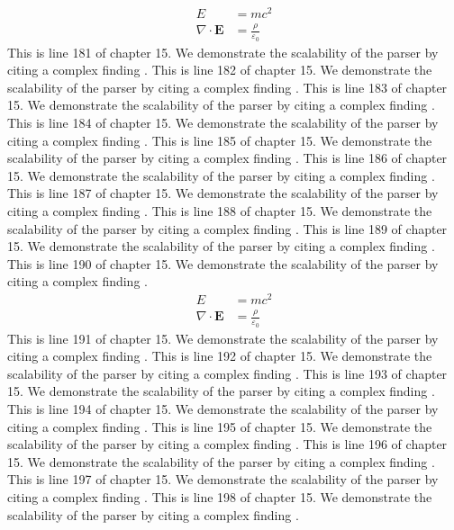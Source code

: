 \begin{align*}
  E &= mc^2 \\
  \nabla \cdot \mathbf{E} &= \frac{\rho}{\varepsilon_0}
\end{align*}
This is line 181 of chapter 15. We demonstrate the scalability of the parser by citing a complex finding \cite{ref15_181}.
This is line 182 of chapter 15. We demonstrate the scalability of the parser by citing a complex finding \cite{ref15_182}.
This is line 183 of chapter 15. We demonstrate the scalability of the parser by citing a complex finding \cite{ref15_183}.
This is line 184 of chapter 15. We demonstrate the scalability of the parser by citing a complex finding \cite{ref15_184}.
This is line 185 of chapter 15. We demonstrate the scalability of the parser by citing a complex finding \cite{ref15_185}.
This is line 186 of chapter 15. We demonstrate the scalability of the parser by citing a complex finding \cite{ref15_186}.
This is line 187 of chapter 15. We demonstrate the scalability of the parser by citing a complex finding \cite{ref15_187}.
This is line 188 of chapter 15. We demonstrate the scalability of the parser by citing a complex finding \cite{ref15_188}.
This is line 189 of chapter 15. We demonstrate the scalability of the parser by citing a complex finding \cite{ref15_189}.
This is line 190 of chapter 15. We demonstrate the scalability of the parser by citing a complex finding \cite{ref15_190}.
\begin{align*}
  E &= mc^2 \\
  \nabla \cdot \mathbf{E} &= \frac{\rho}{\varepsilon_0}
\end{align*}
This is line 191 of chapter 15. We demonstrate the scalability of the parser by citing a complex finding \cite{ref15_191}.
This is line 192 of chapter 15. We demonstrate the scalability of the parser by citing a complex finding \cite{ref15_192}.
This is line 193 of chapter 15. We demonstrate the scalability of the parser by citing a complex finding \cite{ref15_193}.
This is line 194 of chapter 15. We demonstrate the scalability of the parser by citing a complex finding \cite{ref15_194}.
This is line 195 of chapter 15. We demonstrate the scalability of the parser by citing a complex finding \cite{ref15_195}.
This is line 196 of chapter 15. We demonstrate the scalability of the parser by citing a complex finding \cite{ref15_196}.
This is line 197 of chapter 15. We demonstrate the scalability of the parser by citing a complex finding \cite{ref15_197}.
This is line 198 of chapter 15. We demonstrate the scalability of the parser by citing a complex finding \cite{ref15_198}.
